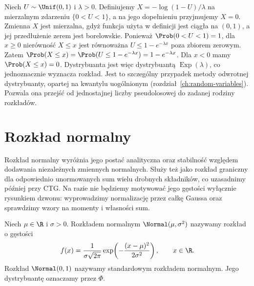 \begin{przyklad}
Niech $U\sim\Unif(0,1)$ i $\lambda>0$. Definiujemy
$X=-\log(1-U)/\lambda$ na mierzalnym zdarzeniu $\{0<U<1\}$,
a na jego dopełnieniu przyjmujemy $X=0$.
Zmienna $X$ jest mierzalna, gdyż funkcja użyta w definicji
jest ciągła na $(0,1)$, a jej przedłużenie zerem jest borelowskie.
Ponieważ $\Prob(0<U<1)=1$, dla $x\geq0$ nierówność
$X\leq x$ jest równoważna $U\leq1-e^{-\lambda x}$
poza zbiorem zerowym. Zatem
$\Prob(X\leq x)=\Prob(U\leq1-e^{-\lambda x})=1-e^{-\lambda x}$.
Dla $x<0$ mamy $\Prob(X\leq x)=0$. Dystrybuanta jest
więc dystrybuantą $\operatorname{Exp}(\lambda)$, co
jednoznacznie wyznacza rozkład.
Jest to szczególny przypadek metody odwrotnej dystrybuanty,
opartej na kwantylu uogólnionym (rozdział~\ref{ch:random-variables}). Pozwala ona przejść od
jednostajnej liczby pseudolosowej do zadanej rodziny rozkładów.
\end{przyklad}

\section{Rozkład normalny}
Rozkład normalny wyróżnia jego postać analityczna oraz stabilność
względem dodawania niezależnych zmiennych normalnych. Służy też
jako rozkład graniczny dla odpowiednio unormowanych sum
wielu drobnych składników, co uzasadnimy później przy CTG.
Na razie nie będziemy motywować jego gęstości wyłącznie
rysunkiem dzwonu: wyprowadzimy normalizację przez całkę Gaussa
oraz sprawdzimy wzory na momenty i własności sum.

\begin{definicja}
Niech $\mu\in\R$ i $\sigma>0$. Rozkładem normalnym
$\Normal(\mu,\sigma^2)$ nazywamy rozkład o gęstości
\begin{equation}\label{eq:normal}
f(x)=\frac{1}{\sigma\sqrt{2\pi}}
\exp\!\left(-\frac{(x-\mu)^2}{2\sigma^2}\right),
\qquad x\in\R.
\end{equation}
Rozkład $\Normal(0,1)$ nazywamy standardowym rozkładem normalnym.
Jego dystrybuantę oznaczamy przez $\Phi$.
\end{definicja}

